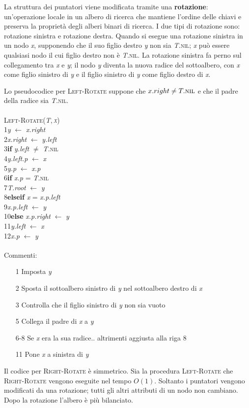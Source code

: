 \documentclass[10pt, a4paper]{report}
\newcommand\firsttab[1][0.5cm]{\hspace*{#1}}
\newcommand\secondtab[1][1cm]{\hspace*{#1}}
\begin{document}
La struttura dei puntatori viene modificata tramite una \textbf{rotazione}: un'operazione locale in un albero di ricerca che mantiene l'ordine delle chiavi e preserva la proprietà degli alberi binari di ricerca. I due tipi di rotazione sono: rotazione sinistra e rotazione destra. Quando si esegue una rotazione sinistra in un nodo \textit{x}, supponendo che il suo figlio destro \textit{y} non sia \textit{T.}\textsc{nil}; \textit{x} può essere qualsiasi nodo il cui figlio destro non è \textit{T.}\textsc{nil}. La rotazione sinistra fa perno sul collegamento tra \textit{x} e \textit{y}; il nodo \textit{y} diventa la nuova radice del sottoalbero, con \textit{x} come figlio sinistro di \textit{y} e il figlio sinistro di \textit{y} come figlio destro di \textit{x}.

Lo pseudocodice per \textsc{Left-Rotate} suppone che $x.right \not= T.\textsc{nil}$ e che il padre della radice sia \textit{T.}\textsc{nil}.\\\\
\textsc{Left-Rotate(\textit{T},\,\textit{x})}\\
1\firsttab\textit{y} $\leftarrow$ \textit{x.right}\\
2\firsttab\textit{x.right} $\leftarrow$ \textit{y.left}\\
3\firsttab\textbf{if} \textit{y.left} $\not=$ \textit{T.}\textsc{nil}\\
4\secondtab\textit{y.left.p} $\leftarrow$ \textit{x}\\
5\firsttab\textit{y.p} $\leftarrow$ \textit{x.p}\\
6\firsttab\textbf{if} \textit{x.p} = \textit{T.}\textsc{nil}\\
7\secondtab\textit{T.root} $\leftarrow$ \textit{y}\\
8\firsttab\textbf{elseif} \textit{x} = \textit{x.p.left}\\
9\secondtab\textit{x.p.left} $\leftarrow$ \textit{y}\\
10\firsttab\textbf{else} \textit{x.p.right} $\leftarrow$ \textit{y}\\
11\firsttab\textit{y.left} $\leftarrow$ \textit{x}\\
12\firsttab\textit{x.p} $\leftarrow$ \textit{y}\\\\
Commenti:
\begin{enumerate}
\item[1]Imposta \textit{y}
\item[2]Sposta il sottoalbero sinistro di \textit{y} nel sottoalbero destro di \textit{x}
\item[3]Controlla che il figlio sinistro di \textit{y} non sia vuoto
\item[5]Collega il padre di \textit{x} a \textit{y}
\item[6-8]Se \textit{x} era la sua radice.. altrimenti aggiusta alla riga 8
\item[11]Pone \textit{x} a sinistra di \textit{y}
\end{enumerate}
Il codice per \textsc{Right-Rotate} è simmetrico. Sia la procedura \textsc{Left-Rotate} che \textsc{Right-Rotate} vengono eseguite nel tempo $O(1)$. Soltanto i puntatori vengono modificati da una rotazione; tutti gli altri attributi di un nodo non cambiano. Dopo la rotazione l'albero è più bilanciato.
\end{document}

